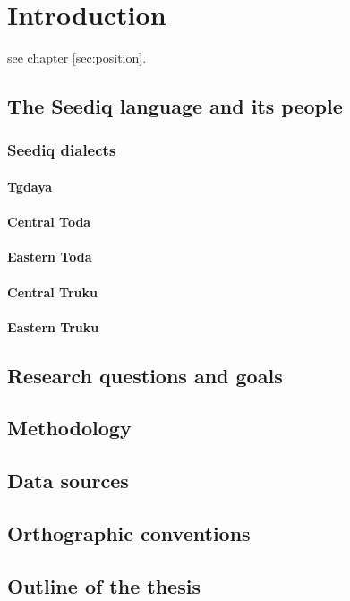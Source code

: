 \chapter{Introduction}
\lipsum[1-2] \textcite{blust1999subgrouping} \pan

see chapter \ref{sec:position}. 

\section{The Seediq language and its people}
\lipsum[1-3]

\subsection{Seediq dialects}
\lipsum[1]

\subsubsection{Tgdaya}
\lipsum[1-2]

\subsubsection{Central Toda}
\lipsum[1]

\subsubsection{Eastern Toda}
\lipsum[1]

\subsubsection{Central Truku}
\lipsum[1]

\subsubsection{Eastern Truku}
\lipsum[1]

\lipsum[1]

\section{Research questions and goals}
\lipsum[1-4]

\section{Methodology}
\lipsum[1-7]

\section{Data sources}
\lipsum[1-3]

\section{Orthographic conventions}
\lipsum[1-5]

\section{Outline of the thesis}
\lipsum[1-2]